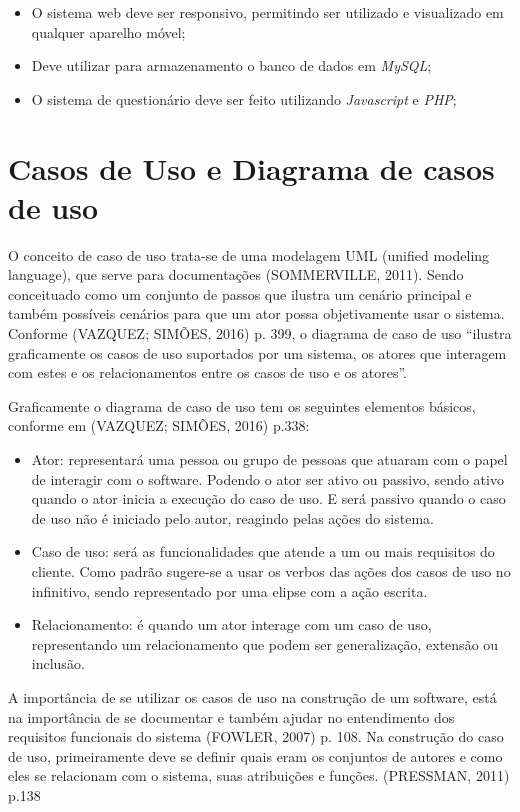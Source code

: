 \documentclass[
	12pt,				%
	openright,			%
	oneside,			%
	a4paper,			%
	english,			%
	french,				%
	spanish,			%
	brazil,				%
	]{abntex2}
\begin{document}
\begin{itemize}
\item O sistema web deve ser responsivo, permitindo ser utilizado e visualizado em qualquer aparelho móvel;
\item Deve utilizar para armazenamento o banco de dados em \textit{MySQL};
\item O sistema de questionário deve ser feito utilizando \textit{Javascript} e \textit{PHP};
\end{itemize}

\section{Casos de Uso e Diagrama de casos de uso}

O conceito de caso de uso trata-se de uma modelagem UML (unified modeling language), que serve para documentações (SOMMERVILLE, 2011). Sendo conceituado como um conjunto de passos que ilustra um cenário principal e também possíveis cenários para que um ator possa objetivamente usar o sistema. Conforme (VAZQUEZ; SIMÕES, 2016) p. 399, o diagrama de caso de uso “ilustra graficamente os casos de uso suportados por um sistema, os atores que interagem com estes e os relacionamentos entre os casos de uso e os atores”.

Graficamente o diagrama de caso de uso tem os seguintes elementos básicos, conforme em (VAZQUEZ; SIMÕES, 2016) p.338:

\begin{itemize}
\item Ator: representará uma pessoa ou grupo de pessoas que atuaram com o papel de interagir com o software. Podendo o ator ser ativo ou passivo, sendo ativo quando o ator inicia a execução do caso de uso. E será passivo quando o caso de uso não é iniciado pelo autor, reagindo pelas ações do sistema.
\item Caso de uso: será as funcionalidades que atende a um ou mais requisitos do cliente. Como padrão sugere-se a usar os verbos das ações dos casos de uso no infinitivo, sendo representado por uma elipse com a ação escrita.
\item Relacionamento: é quando um ator interage com um caso de uso, representando um relacionamento que podem ser generalização, extensão ou inclusão.
\end{itemize}

A importância de se utilizar os casos de uso na construção de um software, está na importância de se documentar e também ajudar no entendimento dos requisitos funcionais do sistema (FOWLER, 2007) p. 108. Na construção do caso de uso, primeiramente deve se definir quais eram os conjuntos de autores e como eles se relacionam com o sistema, suas atribuições e funções. (PRESSMAN, 2011) p.138
\end{document}
